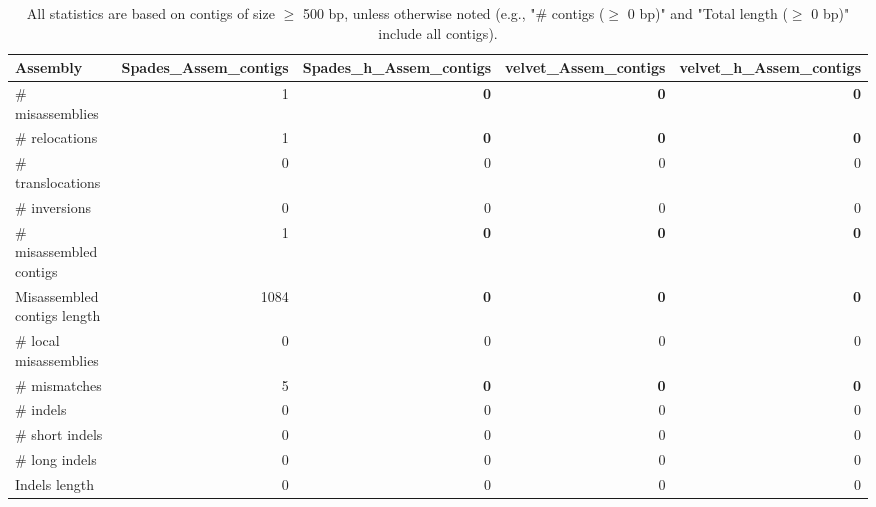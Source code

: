 \documentclass[12pt,a4paper]{article}
\begin{document}
\begin{table}[ht]
\begin{center}
\caption{All statistics are based on contigs of size $\geq$ 500 bp, unless otherwise noted (e.g., "\# contigs ($\geq$ 0 bp)" and "Total length ($\geq$ 0 bp)" include all contigs).}
\begin{tabular}{|l*{4}{|r}|}
\hline
Assembly & Spades\_Assem\_contigs & Spades\_h\_Assem\_contigs & velvet\_Assem\_contigs & velvet\_h\_Assem\_contigs \\ \hline
\# misassemblies & 1 & {\bf 0} & {\bf 0} & {\bf 0} \\ \hline
\hspace{5mm}\# relocations & 1 & {\bf 0} & {\bf 0} & {\bf 0} \\ \hline
\hspace{5mm}\# translocations & 0 & 0 & 0 & 0 \\ \hline
\hspace{5mm}\# inversions & 0 & 0 & 0 & 0 \\ \hline
\# misassembled contigs & 1 & {\bf 0} & {\bf 0} & {\bf 0} \\ \hline
Misassembled contigs length & 1084 & {\bf 0} & {\bf 0} & {\bf 0} \\ \hline
\# local misassemblies & 0 & 0 & 0 & 0 \\ \hline
\# mismatches & 5 & {\bf 0} & {\bf 0} & {\bf 0} \\ \hline
\# indels & 0 & 0 & 0 & 0 \\ \hline
\hspace{5mm}\# short indels & 0 & 0 & 0 & 0 \\ \hline
\hspace{5mm}\# long indels & 0 & 0 & 0 & 0 \\ \hline
Indels length & 0 & 0 & 0 & 0 \\ \hline
\end{tabular}
\end{center}
\end{table}
\end{document}
